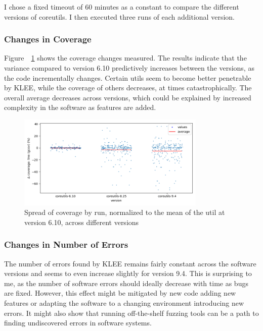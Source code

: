 \documentclass{article}
\let\savedRef=\ref
\renewcommand{\ref}{\unskip~\savedRef}
\begin{document}
I chose a fixed timeout of 60 minutes as a constant to compare the different versions of coreutils. I then executed three runs of each additional version.

\subsubsection{Changes in Coverage}

Figure~\ref{fig:spread_across_versions_gcov} shows the coverage changes measured. The results indicate that the variance compared to version 6.10 predictively increases between the versions, as the code incrementally changes. Certain utils seem to become better penetrable by KLEE, while the coverage of others decreases, at times catastrophically. The overall average decreases across versions, which could be explained by increased complexity in the software as features are added.

\begin{figure}[htbp]
    \centering
    \includegraphics[width=0.8\textwidth]{../plots/gcov_cov/changes-by-version.png}
    \captionsetup{width=0.6\textwidth}
    \caption{Spread of coverage by run, normalized to the mean of the util at version 6.10, across different versions}
    \label{fig:spread_across_versions_gcov}
\end{figure}


\subsubsection{Changes in Number of Errors}

The number of errors found by KLEE remains fairly constant across the software versions and seems to even increase slightly for version 9.4. This is surprising to me, as the number of software errors should ideally decrease with time as bugs are fixed. However, this effect might be mitigated by new code adding new features or adapting the software to a changing environment introducing new errors. It might also show that running off-the-shelf fuzzing tools can be a path to finding undiscovered errors in software systems.
\end{document}
